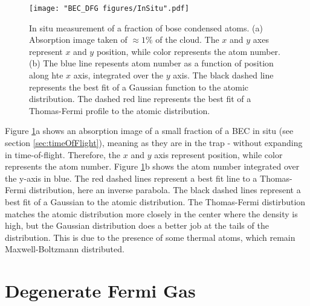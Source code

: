 \begin{figure}
	\texttt{[image: "BEC\_DFG figures/InSitu".pdf]}
\caption{In situ measurement of a fraction of bose condensed atoms. (a) Absorption image taken of $\approx1\%$ of the cloud. The $x$ and $y$ axes represent $x$ and $y$ position, while color represents the atom number. (b) The blue line repesents atom number as a function of position along hte $x$ axis, integrated over the $y$ axis. The black dashed line represents the best fit of a Gaussian function to the atomic distribution. The dashed red line represents the best fit of a Thomas-Fermi profile to the atomic distribution.}
\label{fig:InSitu}
\end{figure}

Figure \ref{fig:InSitu}a shows an absorption image of a small fraction of a BEC in situ (see section \ref{sec:timeOfFlight}), meaning as they are in the trap - without expanding in time-of-flight. Therefore, the $x$ and $y$ axis represent position, while color represents the atom number. Figure \ref{fig:InSitu}b shows the atom number integrated over the y-axis in blue. The red dashed lines represent a best fit line to a Thomas-Fermi distribution, here an inverse parabola. The black dashed lines represent a best fit of a Gaussian to the atomic distribution. The Thomas-Fermi distirbution matches the atomic distribution more closely in the center where the density is high, but the Gaussian distribution does a better job at the tails of the distribution. This is due to the presence of some thermal atoms, which remain Maxwell-Boltzmann distributed. 


\section{Degenerate Fermi Gas}

